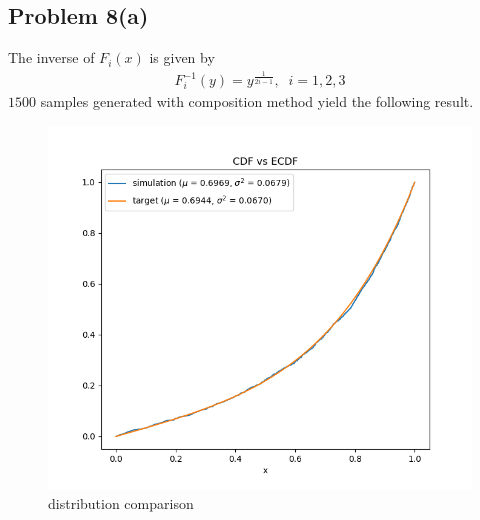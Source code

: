 \documentclass{article}
\begin{document}
\subsection*{Problem 8(a)}
The inverse of $F_{i}(x)$ is given by
\begin{align*}
  F_{i}^{-1}(y)=y^{\frac{1}{2i-1}}, \;\; i=1,2,3
\end{align*}
$1500$ samples generated with composition method yield the following result.
\begin{figure}[h!]
    \centering
    \includegraphics[width=\linewidth]{../images/p8a_dist_incomp_1500.png}
    \caption{distribution comparison}
\end{figure}
\newpage
\end{document}
